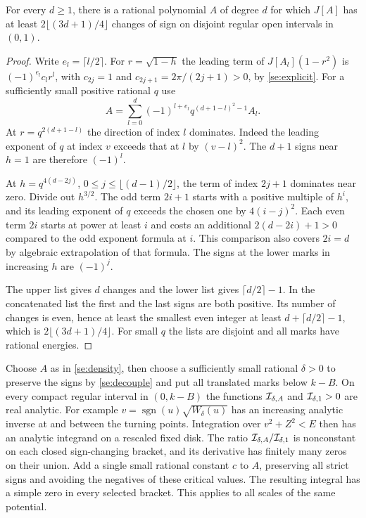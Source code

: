 \begin{lemma}\label{se:zeros}
For every \(d\ge1\), there is a rational polynomial \(A\) of degree
\(d\) for which \(J[A]\) has at least \(2\lfloor(3d+1)/4\rfloor\)
changes of sign on disjoint regular open intervals in \((0,1)\).
\end{lemma}
\begin{proof}
Write \(e_l=\lceil l/2\rceil\). For \(r=\sqrt{1-h}\) the leading term
of \(J[A_l](1-r^2)\) is \((-1)^{e_l}c_l r^l\), with \(c_{2j}=1\) and
\(c_{2j+1}=2\pi/(2j+1)>0\), by \eqref{se:explicit}.
For a sufficiently small positive rational \(q\) use
\begin{equation}
 A=\sum_{l=0}^d(-1)^{l+e_l}q^{(d+1-l)^2-1} A_l .                  \label{se:density}
\end{equation}
At \(r=q^{2(d+1-l)}\) the direction of index \(l\) dominates. Indeed
the leading exponent of \(q\) at index \(v\) exceeds that at \(l\) by
\((v-l)^2\). The \(d+1\) signs near \(h=1\) are therefore \((-1)^l\).

At \(h=q^{4(d-2j)}\), \(0\le j\le\lfloor(d-1)/2\rfloor\), the term of
index \(2j+1\) dominates near zero. Divide out \(h^{3/2}\). The odd
term \(2i+1\) starts with a positive multiple of \(h^i\), and its leading
exponent of \(q\) exceeds the chosen one by \(4(i-j)^2\). Each even term
\(2i\) starts at power at least \(i\) and costs an additional
\(2(d-2i)+1>0\) compared to the odd exponent formula at \(i\). This
comparison also covers \(2i=d\) by algebraic extrapolation of that
formula. The signs at the lower marks in increasing \(h\) are
\((-1)^j\).

The upper list gives \(d\) changes and the lower list gives
\(\lceil d/2\rceil-1\). In the concatenated list the first and the
last signs are both positive. Its number of changes is even, hence
at least the smallest even integer at least \(d+\lceil d/2\rceil-1\),
which is \(2\lfloor(3d+1)/4\rfloor\). For small \(q\) the lists are
disjoint and all marks have rational energies.
\end{proof}

Choose \(A\) as in \eqref{se:density}, then choose a sufficiently small
rational \(\delta>0\) to preserve the signs by \eqref{se:decouple} and put
all translated marks below \(k-B\). On every compact regular interval in
\((0,k-B)\) the functions \({\cal I}_{\delta,A}\) and
\({\cal I}_{\delta,1}>0\) are real analytic. For example
\(v=\operatorname{sgn}(u)\sqrt{W_\delta(u)}\) has an increasing analytic
inverse at and between the turning points. Integration over
\(v^2+Z^2<E\) then has an analytic integrand on a rescaled fixed disk.
The ratio \({\cal I}_{\delta,A}/{\cal I}_{\delta,1}\) is nonconstant on
each closed sign-changing bracket, and its derivative has finitely many
zeros on their union. Add a single small rational constant \(c\) to
\(A\), preserving all strict signs and avoiding the negatives of these
critical values. The resulting integral has a simple zero in every
selected bracket. This applies to all scales of the same potential.

